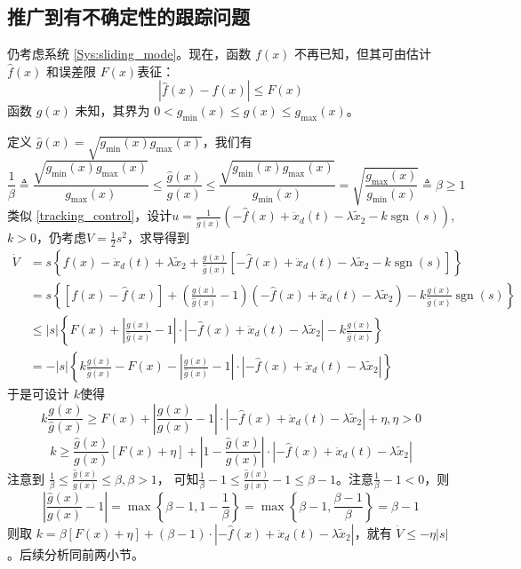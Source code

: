 \subsection{推广到有不确定性的跟踪问题}\label{5C3ref}
仍考虑系统 \eqref{Sys:sliding_mode}。现在，函数 $f (x)$ 不再已知，但其可由估计$\hat{f} (x)$ 和误差限 $F (x)$表征：
\[ | \hat{f} (x) - f (x) | \leq F (x) \]
函数 $g (x)$ 未知，其界为 $0 < g_{\min} (x) \leq g (x) \leq g_{\max}(x)$。

定义 $\hat{g} (x) = \sqrt{g_{\min} (x) g_{\max} (x)}$，我们有
\[ \frac{1}{\beta} \triangleq \frac{\sqrt{g_{\min} (x) g_{\max}
   (x)}}{g_{\max} (x)} \leq \frac{\hat{g} (x)}{g (x)} \leq
   \frac{\sqrt{g_{\min} (x) g_{\max} (x)}}{g_{\min} (x)} =
   \sqrt{\frac{g_{\max} (x)}{g_{\min} (x)}} \triangleq \beta \geq 1 \]
类似 \eqref{tracking_control}，设计$u = \frac{1}{\hat{g} (x)} (- \hat{f} (x) + \ddot{x}_d (t) - \lambda
\tilde{x}_2 - k  \ensuremath{\operatorname{sgn}} (s))$, $k > 0$，仍考虑$V=\frac12 s^2$，求导得到
\begin{align*}
  \dot{V} & = s \left\{ f (x) - \ddot{x}_d (t) + \lambda \tilde{x}_2 +
  \frac{g (x)}{\hat{g} (x)} [- \hat{f} (x) + \ddot{x}_d (t) - \lambda
  \tilde{x}_2 - k  \ensuremath{\operatorname{sgn}} (s)] \right\}\\
  & = s \left\{ [f (x) - \hat{f} (x)] + \left( \frac{g (x)}{\hat{g} (x)} -
  1 \right) (- \hat{f} (x) + \ddot{x}_d (t) - \lambda \tilde{x}_2) - k \frac{g
  (x)}{\hat{g} (x)}  \ensuremath{\operatorname{sgn}} (s) \right\}\\
  & \leq | s | \left\{ F (x) + \left| \frac{g (x)}{\hat{g} (x)} - 1 \right|
  \cdot | - \hat{f} (x) + \ddot{x}_d (t) - \lambda \tilde{x}_2 | - k \frac{g
  (x)}{\hat{g} (x)} \right\}\\
  & = - | s | \left\{ k \frac{g (x)}{\hat{g} (x)} - F (x) - \left| \frac{g
  (x)}{\hat{g} (x)} - 1 \right| \cdot | - \hat{f} (x) + \ddot{x}_d (t) -
  \lambda \tilde{x}_2 | \right\}
\end{align*}
于是可设计 $k$使得
\[ k \frac{g (x)}{\hat{g} (x)} \geq F (x) + \left| \frac{g (x)}{\hat{g} (x)} -
   1 \right| \cdot | - \hat{f} (x) + \ddot{x}_d (t) - \lambda \tilde{x}_2 | +
   \eta, \eta > 0 \]
\[ k \geq \frac{\hat{g} (x)}{g (x)} [F (x) + \eta] + \left| 1 - \frac{\hat{g}
   (x)}{g (x)} \right| \cdot | - \hat{f} (x) + \ddot{x}_d (t) - \lambda
   \tilde{x}_2 | \]
注意到 $\frac{1}{\beta} \leq \frac{\hat{g} (x)}{g (x)} \leq \beta, \beta >1$，
可知$ \frac1\beta -1\le \frac{\hat{g}(x)}{g (x)}-1 \le\beta-1 $。注意$\frac1\beta -1<0$，则\[\left|  \frac{\hat{g}
   (x)}{g (x)}-1 \right|=\max\left\{\beta-1,1-\frac{1}{\beta}\right\}=\max\left\{\beta-1,\frac{\beta-1}{\beta}\right\}=\beta-1\]
则取 $k = \beta [F (x) + \eta] + (\beta - 1) \cdot | - \hat{f} (x) +\ddot{x}_d (t) - \lambda \tilde{x}_2 |$，就有 $\dot{V} \leq - \eta | s|$。后续分析同前两小节。
